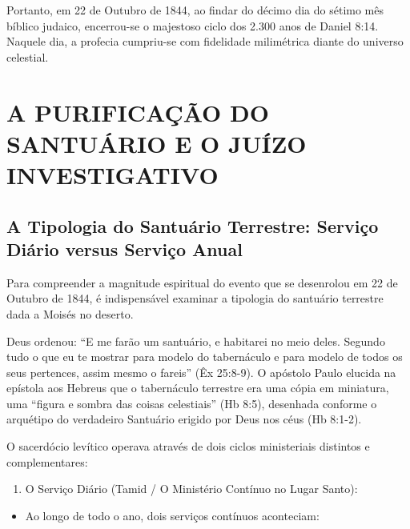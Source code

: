 \documentclass[11pt,a4paper,openany]{book}
\begin{document}
Portanto, em 22 de Outubro de 1844, ao findar do décimo dia do sétimo mês bíblico judaico, encerrou-se o majestoso ciclo dos 2.300 anos de Daniel 8:14. Naquele dia, a profecia cumpriu-se com fidelidade milimétrica diante do universo celestial.



\section{A PURIFICAÇÃO DO SANTUÁRIO E O JUÍZO INVESTIGATIVO}



\subsection{A Tipologia do Santuário Terrestre: Serviço Diário versus Serviço Anual}


Para compreender a magnitude espiritual do evento que se desenrolou em 22 de Outubro de 1844, é indispensável examinar a tipologia do santuário terrestre dada a Moisés no deserto.

Deus ordenou: ``E me farão um santuário, e habitarei no meio deles. Segundo tudo o que eu te mostrar para modelo do tabernáculo e para modelo de todos os seus pertences, assim mesmo o fareis'' (Êx 25:8-9). O apóstolo Paulo elucida na epístola aos Hebreus que o tabernáculo terrestre era uma cópia em miniatura, uma ``figura e sombra das coisas celestiais'' (Hb 8:5), desenhada conforme o arquétipo do verdadeiro Santuário erigido por Deus nos céus (Hb 8:1-2).

O sacerdócio levítico operava através de dois ciclos ministeriais distintos e complementares:

\begin{enumerate}
  \item O Serviço Diário (Tamid / O Ministério Contínuo no Lugar Santo):
\end{enumerate}

\begin{itemize}
  \item Ao longo de todo o ano, dois serviços contínuos aconteciam:
\end{itemize}
\end{document}
